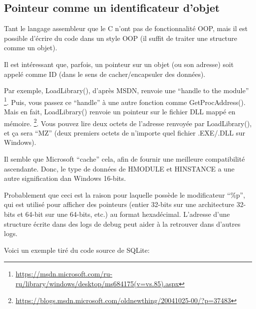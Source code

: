 \subsection{Pointeur comme un identificateur d'objet}

Tant le langage assembleur que le C n'ont pas de fonctionnalité \ac{OOP}, mais il
est possible d'écrire du code dans un style \ac{OOP} (il suffit de traiter une structure
comme un objet).

Il est intéressant que, parfois, un pointeur sur un objet (ou son adresse) soit appelé
comme ID (dans le sens de cacher/encapsuler des données).

Par exemple, LoadLibrary(), d'après \ac{MSDN}, renvoie une ``handle to the module''
\footnote{\url{https://msdn.microsoft.com/ru-ru/library/windows/desktop/ms684175(v=vs.85).aspx}}.
Puis, vous passez ce ``handle'' à une autre fonction comme GetProcAddress().
Mais en fait, LoadLibrary() renvoie un pointeur sur le fichier DLL mappé en mémoire.
\footnote{\url{https://blogs.msdn.microsoft.com/oldnewthing/20041025-00/?p=37483}}.
Vous pouvez lire deux octets de l'adresse renvoyée par LoadLibrary(), et ça sera
``MZ'' (deux premiers octets de n'importe quel fichier .EXE/.DLL sur Windows).

Il semble que Microsoft ``cache'' cela, afin de fournir une meilleure compatibilité
ascendante. Donc, le type de données de HMODULE et HINSTANCE a une autre signification
dan Windows 16-bits.

Probablement que ceci est la raison pour laquelle \printf possède le modificateur
``\%p'', qui est utilisé pour afficher des pointeurs (entier 32-bits sur une architecture
32-bits et 64-bit sur une 64-bits, etc.) au format hexadécimal.
L'adresse d'une structure écrite dans des logs de debug peut aider à la retrouver
dans d'autres logs.

Voici un exemple tiré du code source de SQLite:

